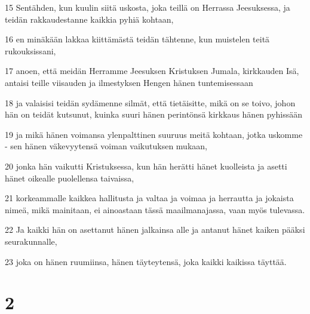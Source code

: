 \par 15 Sentähden, kun kuulin siitä uskosta, joka teillä on Herrassa Jeesuksessa, ja teidän rakkaudestanne kaikkia pyhiä kohtaan,
\par 16 en minäkään lakkaa kiittämästä teidän tähtenne, kun muistelen teitä rukouksissani,
\par 17 anoen, että meidän Herramme Jeesuksen Kristuksen Jumala, kirkkauden Isä, antaisi teille viisauden ja ilmestyksen Hengen hänen tuntemisessaan
\par 18 ja valaisisi teidän sydämenne silmät, että tietäisitte, mikä on se toivo, johon hän on teidät kutsunut, kuinka suuri hänen perintönsä kirkkaus hänen pyhissään
\par 19 ja mikä hänen voimansa ylenpalttinen suuruus meitä kohtaan, jotka uskomme - sen hänen väkevyytensä voiman vaikutuksen mukaan,
\par 20 jonka hän vaikutti Kristuksessa, kun hän herätti hänet kuolleista ja asetti hänet oikealle puolellensa taivaissa,
\par 21 korkeammalle kaikkea hallitusta ja valtaa ja voimaa ja herrautta ja jokaista nimeä, mikä mainitaan, ei ainoastaan tässä maailmanajassa, vaan myös tulevassa.
\par 22 Ja kaikki hän on asettanut hänen jalkainsa alle ja antanut hänet kaiken pääksi seurakunnalle,
\par 23 joka on hänen ruumiinsa, hänen täyteytensä, joka kaikki kaikissa täyttää.

\chapter{2}

